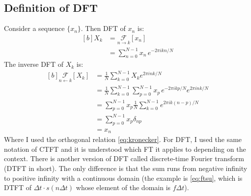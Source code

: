 \documentclass[letterpaper, 11pt]{article}
\newcommand{\fourier}[3]{\underset{#1 \rightarrow #3}{\mathcal{F}}[#2]} %
\newcommand{\ifourier}[3]{\underset{#3 \leftarrow #1}{\mathcal{F}}[#2]} %
\newcommand{\ssum}[1]{\sum_{#1 = 0}^{N - 1}} %
\newcommand{\dft}[3]{\ssum{#1} #2 e^{-2\pi i#3#1/N}} %
\newcommand{\idft}[3]{\frac{1}{N}\ssum{#1} #2 e^{2\pi i#3#1/N}} %
\numberwithin{equation}{section}
\numberwithin{figure}{section}
\numberwithin{table}{section}
\begin{document}
\subsection{Definition of DFT}
Consider a sequence \(\{x_{n}\}\). Then DFT of \(x_{n}\) is:
\begin{equation}
	\begin{aligned}[b]
		X_{k}	&= \fourier{n}{x_{n}}{k}\\
			&= \dft{n}{x_{n}\,}{k}
	\end{aligned}
\end{equation}
The inverse DFT of \(X_{k}\) is:
\begin{equation}
	\begin{aligned}[b]
		\ifourier{k}{X_{k}}{n}
			&= \idft{k}{X_{k}}{n}\\
			&= \idft{k}{\dft{p}{x_{p}\,}{k}}{n}\\
			&= \ssum{p} x_{p} \frac{1}{N}\ssum{k} e^{2\pi ik(n-p)/N}\\
			&= \ssum{p} x_{p} \delta_{np}\\
			&= x_{n}
	\end{aligned}
\end{equation}
Where I used the orthogonal relation \eqref{eq:kronecker}\cite{james}. For DFT, I used the same notation of CTFT and it is understood which FT it applies to depending on the context. There is another version of DFT called discrete-time Fourier transform (DTFT in short). The only difference is that the sum runs from negative infinity to positive infinity with a continuous domain (the example is \eqref{eq:ftsu}, which is DTFT of \(\Delta t\cdot s(n\Delta t)\) whose element of the domain is \(f\Delta t\)). 

\end{document}
